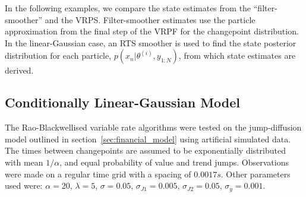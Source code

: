 \documentclass[10pt,twocolumn,twoside]{IEEEtran}
\begin{document}
In the following examples, we compare the state estimates from the ``filter-smoother'' \cite{Kitagawa1996} and the VRPS. Filter-smoother estimates use the particle approximation from the final step of the VRPF for the changepoint distribution. In the linear-Gaussian case, an RTS smoother is used to find the state posterior distribution for each particle, $p(x_n|\theta^{(i)}, y_{1:N})$, from which state estimates are derived.





\subsection{Conditionally Linear-Gaussian Model} \label{sec:finance}

The Rao-Blackwellised variable rate algorithms were tested on the jump-diffusion model outlined in section~\ref{sec:financial_model} using artificial simulated data. The times between changepoints are assumed to be exponentially distributed with mean $1/\alpha$, and equal probability of value and trend jumps. Observations were made on a regular time grid with a spacing of $0.0017s$. Other parameters used were: $\alpha = 20$, $\lambda = 5$, $\sigma = 0.05$, $\sigma_{J1} = 0.005$, $\sigma_{J2} = 0.05$, $\sigma_{y} = 0.001$.
\end{document}
